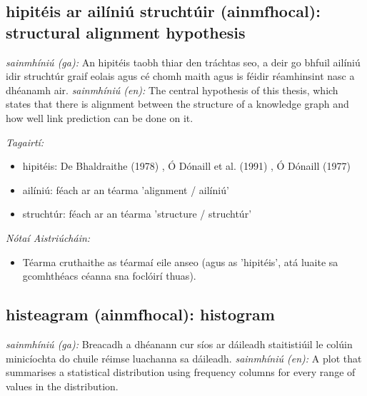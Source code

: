 \documentclass{article}
\begin{document}
\subsection*{hipitéis ar ailíniú struchtúir (ainmfhocal): structural alignment hypothesis} 
 \noindent \textit{sainmhíniú (ga):} An hipitéis taobh thiar den tráchtas seo, a deir go bhfuil ailíniú idir struchtúr graif eolais agus cé chomh maith agus is féidir réamhinsint nasc a dhéanamh air.
\newline\newline
 \noindent \textit{sainmhíniú (en):} The central hypothesis of this thesis, which states that there is alignment between the structure of a knowledge graph and how well link prediction can be done on it.
\newline

 \noindent \textit{Tagairtí:}
\begin{itemize}
	\item hipitéis: De Bhaldraithe (1978) \cite{de-bhaldraithe}, Ó Dónaill et al. (1991) \cite{focloir-beag}, Ó Dónaill (1977) \cite{odonaill}
	\item ailíniú: féach ar an téarma 'alignment / ailíniú'
	\item struchtúr: féach ar an téarma 'structure / struchtúr'
\end{itemize}

 \noindent \textit{Nótaí Aistriúcháin:}
\begin{itemize}
	\item Téarma cruthaithe as téarmaí eile anseo (agus as 'hipitéis', atá luaite sa gcomhthéacs céanna sna foclóirí thuas).
\end{itemize}


\subsection*{histeagram (ainmfhocal): histogram} 
 \noindent \textit{sainmhíniú (ga):} Breacadh a dhéanann cur síos ar dáileadh staitistiúil le colúin minicíochta do chuile réimse luachanna sa dáileadh.
\newline\newline
 \noindent \textit{sainmhíniú (en):} A plot that summarises a statistical distribution using frequency columns for every range of values in the distribution.
\newline
\end{document}
